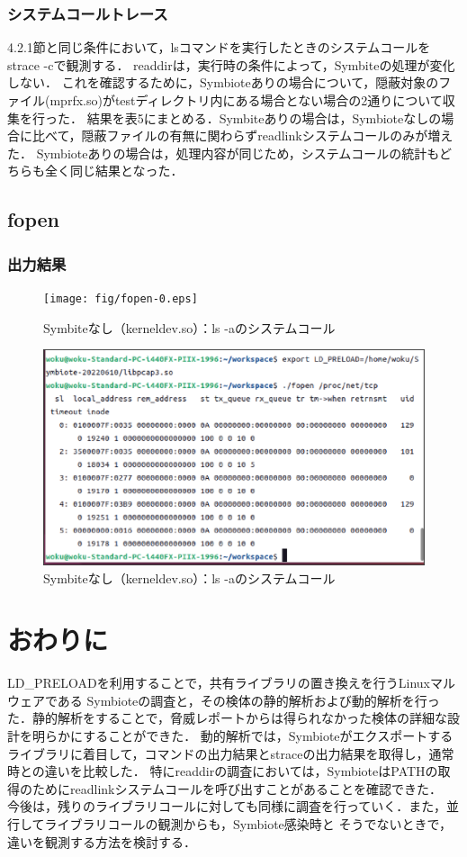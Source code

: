 \documentclass[submit,techreq,noauthor]{eco}	%
\begin{document}
\subsubsection{システムコールトレース}
4.2.1節と同じ条件において，lsコマンドを実行したときのシステムコールをstrace -cで観測する．
readdirは，実行時の条件によって，Symbiteの処理が変化しない．
これを確認するために，Symbioteありの場合について，隠蔽対象のファイル(mprfx.so)がtestディレクトリ内にある場合とない場合の2通りについて収集を行った．
結果を表5にまとめる．Symbiteありの場合は，Symbioteなしの場合に比べて，隠蔽ファイルの有無に関わらずreadlinkシステムコールのみが増えた．
Symbioteありの場合は，処理内容が同じため，システムコールの統計もどちらも全く同じ結果となった．

\subsection{fopen}
\subsubsection{出力結果}


\begin{figure}[t]
	\centering
  \texttt{[image: fig/fopen-0.eps]}
	\caption{Symbiteなし（kerneldev.so）：ls -aのシステムコール}
	\label{fig:fopen0}
\end{figure}

\begin{figure}[t]
	\centering
  \includegraphics[width=12cm]{fig/fopen-1.eps}
	\caption{Symbiteなし（kerneldev.so）：ls -aのシステムコール}
	\label{fig:fopen1}
\end{figure}


\section{おわりに}
LD\_PRELOADを利用することで，共有ライブラリの置き換えを行うLinuxマルウェアである
Symbioteの調査と，その検体の静的解析および動的解析を行った．静的解析をすることで，脅威レポートからは得られなかった検体の詳細な設計を明らかにすることができた．
動的解析では，Symbioteがエクスポートするライブラリに着目して，コマンドの出力結果とstraceの出力結果を取得し，通常時との違いを比較した．
特にreaddirの調査においては，SymbioteはPATHの取得のためにreadlinkシステムコールを呼び出すことがあることを確認できた．\\
今後は，残りのライブラリコールに対しても同様に調査を行っていく．また，並行してライブラリコールの観測からも，Symbiote感染時と
そうでないときで，違いを観測する方法を検討する．

\setlength\baselineskip{12pt}
{\small
	
	
}
\end{document}
